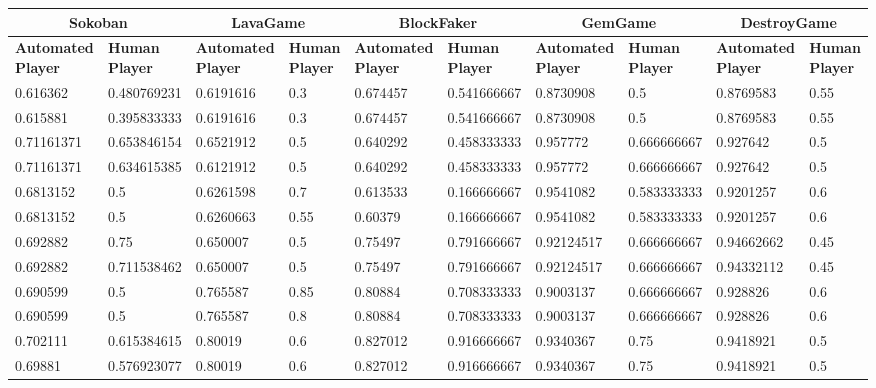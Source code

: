 \begin{landscape}
\begin{table}[!ht]
	\centering
	\begin{tabular}{|p{0.8in}|p{0.8in}|p{0.8in}|p{0.8in}|p{0.8in}|p{0.8in}|p{0.8in}|p{0.8in}|p{0.8in}|p{0.8in}|}
		\hline
		\multicolumn{2}{c}{\textbf{Sokoban}} & \multicolumn{2}{c}{\textbf{LavaGame}} & \multicolumn{2}{c}{\textbf{\textbf{BlockFaker}}} & \multicolumn{2}{c}{\textbf{GemGame}} & \multicolumn{2}{c}{\textbf{DestroyGame}}\\
		\hline
		\textbf{Automated Player} & \textbf{Human Player} & \textbf{Automated Player} & \textbf{Human Player} & \textbf{Automated Player} & \textbf{Human Player} & \textbf{Automated Player} & \textbf{Human Player} & \textbf{Automated Player} & \textbf{Human Player}\\
		\hline
		0.616362 & 0.480769231 & 0.6191616 & 0.3 & 0.674457 & 0.541666667 & 0.8730908 & 0.5 & 0.8769583 & 0.55\\
		\hline
		0.615881 & 0.395833333 & 0.6191616 & 0.3 & 0.674457 & 0.541666667 & 0.8730908 & 0.5 & 0.8769583 & 0.55\\
		\hline
		0.71161371 & 0.653846154 & 0.6521912 & 0.5 & 0.640292 & 0.458333333 & 0.957772 & 0.666666667 & 0.927642 & 0.5\\
		\hline
		0.71161371 & 0.634615385 & 0.6121912 & 0.5 & 0.640292 & 0.458333333 & 0.957772 & 0.666666667 & 0.927642 & 0.5\\
		\hline
		0.6813152 & 0.5 & 0.6261598 & 0.7 & 0.613533 & 0.166666667 & 0.9541082 & 0.583333333 & 0.9201257 & 0.6\\
		\hline
		0.6813152 & 0.5 & 0.6260663 & 0.55 & 0.60379 & 0.166666667 & 0.9541082 & 0.583333333 & 0.9201257 & 0.6\\
		\hline
		0.692882 & 0.75 & 0.650007 & 0.5 & 0.75497 & 0.791666667 & 0.92124517 & 0.666666667 & 0.94662662 & 0.45\\
		\hline
		0.692882 & 0.711538462 & 0.650007 & 0.5 & 0.75497 & 0.791666667 & 0.92124517 & 0.666666667 & 0.94332112 & 0.45\\
		\hline
		0.690599 & 0.5 & 0.765587 & 0.85 & 0.80884 & 0.708333333 & 0.9003137 & 0.666666667 & 0.928826 & 0.6\\
		\hline
		0.690599 & 0.5 & 0.765587 & 0.8 & 0.80884 & 0.708333333 & 0.9003137 & 0.666666667 & 0.928826 & 0.6\\
		\hline
		0.702111 & 0.615384615 & 0.80019 & 0.6 & 0.827012 & 0.916666667 & 0.9340367 & 0.75 & 0.9418921 & 0.5\\
		\hline
		0.69881 & 0.576923077 & 0.80019 & 0.6 & 0.827012 & 0.916666667 & 0.9340367 & 0.75 & 0.9418921 & 0.5\\

\end{tabular}
\end{table}
\end{landscape}
